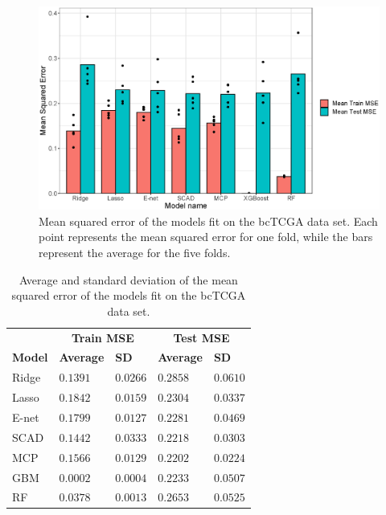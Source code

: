 \documentclass{article}
\begin{document}
\begin{figure}[h!]
	\centering
	\includegraphics[width = 0.8\linewidth]{images/empirical_mse.eps}
	\captionsetup{width = 0.8\textwidth}
	\caption{Mean squared error of the models fit on the bcTCGA data set. Each point represents the mean squared error for one fold, while the bars represent the average for the five folds.}
	\label{fig:empirical_mse}
\end{figure}

\begin{table}[h!]
\centering
\captionsetup{width = 5in}
\caption{Average and standard deviation of the mean squared error of the models fit on the bcTCGA data set.}
\label{tab:emp_results}
\begin{tabular}{l|ll|ll}
	\hline
	& \multicolumn{2}{c|}{\textbf{Train MSE}} & \multicolumn{2}{c}{\textbf{Test MSE}} \\ 
	\textbf{Model } & \textbf{Average} & \textbf{SD} & \textbf{Average} & \textbf{SD} \\ 
	\hline
	Ridge  & $0.1391$ & $0.0266$ & $0.2858$ & $0.0610$ \\
	Lasso  & $0.1842$ & $0.0159$ & $0.2304$ & $0.0337$ \\
	E-net  & $0.1799$ & $0.0127$ & $0.2281$ & $0.0469$ \\
	SCAD  & $0.1442$ & $0.0333$ & $0.2218$ & $0.0303$ \\
	MCP  & $0.1566$ & $0.0129$ & $0.2202$ & $0.0224$ \\
	GBM  & $0.0002$ & $0.0004$ & $0.2233$ & $0.0507$ \\
	RF  & $0.0378$ & $0.0013$ & $0.2653$ & $0.0525$ \\
	\hline 
\end{tabular}
\end{table}
\end{document}
